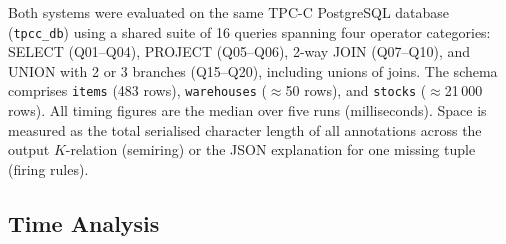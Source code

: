 \documentclass{llncs}
\begin{document}
Both systems were evaluated on the same TPC-C PostgreSQL database
(\texttt{tpcc\_db}) using a shared suite of 16 queries spanning four
operator categories: SELECT (Q01--Q04), PROJECT (Q05--Q06),
2-way JOIN (Q07--Q10), and UNION with 2 or 3 branches (Q15--Q20),
including unions of joins.
The schema comprises \texttt{items} (483 rows),
\texttt{warehouses} ($\approx$50 rows), and
\texttt{stocks} ($\approx$21\,000 rows).
All timing figures are the median over five runs (milliseconds).
Space is measured as the total serialised character length of all
annotations across the output $K$-relation (semiring) or the JSON
explanation for one missing tuple (firing rules).

\subsection{Time Analysis}
\label{sec:eval-time}
\end{document}
